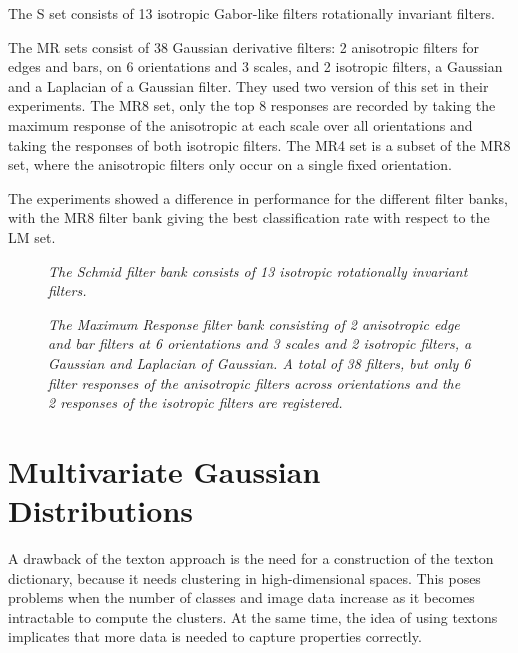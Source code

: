 The S set consists of 13 isotropic Gabor-like filters rotationally invariant filters.

The MR sets consist of 38 Gaussian derivative filters: 2 anisotropic filters for edges and bars, on 6 orientations and 3 scales, and 2 isotropic filters, a Gaussian and a Laplacian of a Gaussian filter. They used two version of this set in their experiments. The MR8 set, only the top 8 responses are recorded by taking the maximum response of the anisotropic at each scale over all orientations and taking the responses of both isotropic filters. The MR4 set is a subset of the MR8 set, where the anisotropic filters only occur on a single fixed orientation.

The experiments showed a difference in performance for the different filter banks, with the MR8 filter bank giving the best classification rate with respect to the LM set. 

\begin{figure}[t]
	\begin{center}
	\end{center}
	\caption{\textit{The Schmid filter bank consists of 13 isotropic rotationally invariant filters.}}
	\label{fig:S}
\end{figure}

\begin{figure}[b]
	\begin{center}
	\end{center}
	\caption{\textit{The Maximum Response filter bank consisting of 2 anisotropic edge and bar filters at 6 orientations and 3 scales and 2 isotropic filters, a Gaussian and Laplacian of Gaussian. A total of 38 filters, but only 6 filter responses of the anisotropic filters across orientations and the 2 responses of the isotropic filters are registered.}}
	\label{fig:MR}
\end{figure}

\section{Multivariate Gaussian Distributions}\label{sec:MGD}
A drawback of the texton approach is the need for a construction of the texton dictionary, because it needs clustering in high-dimensional spaces. This poses problems when the number of classes and image data increase as it becomes intractable to compute the clusters. At the same time, the idea of using textons implicates that more data is needed to capture properties correctly.

